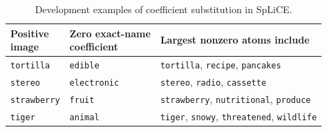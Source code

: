 \documentclass[mlmain,onecolumn]{jmlr}
\begin{document}
\begin{table}[h!]
  \centering
  \caption{Development examples of coefficient substitution in SpLiCE.}
  \label{tab:splice-substitution}
  \small
  \begin{tabular}{@{}p{} p{} p{}@{}}
    \toprule
    \shortstack[l]{Positive\\image} & \shortstack[l]{Zero exact-name\\coefficient} & Largest nonzero atoms include \\
    \midrule
    \texttt{tortilla} & \texttt{edible} & \texttt{tortilla}, \texttt{recipe}, \texttt{pancakes} \\
    \texttt{stereo} & \texttt{electronic} & \texttt{stereo}, \texttt{radio}, \texttt{cassette} \\
    \texttt{strawberry} & \texttt{fruit} & \texttt{strawberry}, \texttt{nutritional}, \texttt{produce} \\
    \texttt{tiger} & \texttt{animal} & \texttt{tiger}, \texttt{snowy}, \texttt{threatened}, \texttt{wildlife} \\
    \bottomrule
  \end{tabular}
\end{table}
\end{document}

